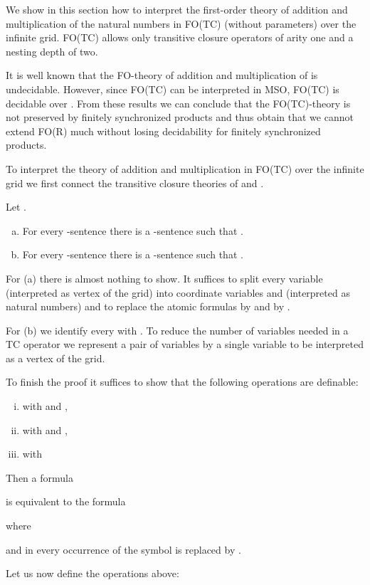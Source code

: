 \documentclass{LMCS}
\begin{document}
{We show in this section how to interpret the first-order theory of 
addition and multiplication of the natural numbers  
in FO(TC) (without parameters) over the infinite grid. 
FO(TC) allows only transitive closure operators of arity one and 
a nesting depth of two. 

It is well known that the FO-theory of addition and multiplication 
of  is undecidable. However, since FO(TC) can be interpreted
in MSO,  FO(TC) is decidable over . From these results we can 
conclude that the  FO(TC)-theory is not preserved by finitely
synchronized products and thus obtain that we cannot extend FO(R)
much without losing decidability for finitely synchronized products.

To interpret the theory of addition and multiplication in FO(TC)
over the infinite grid we first connect the transitive closure theories of
 and .

\begin{lem}\label{lem:grid<->N} Let .
\begin{enumerate}[(a)] 
\item For every -sentence  there is a 
-sentence  such that 
.
\item 
For every -sentence  there is a 
-sentence  such that 
.
\end{enumerate}
\end{lem}
\proof
For (a) there is almost nothing to show. It suffices to split every variable
 (interpreted as vertex of the grid) into coordinate variables  and 
(interpreted as natural numbers) and to replace the atomic formulas
 by  and  by  . 

For (b) we identify every  with .
To reduce the number of variables needed in a TC operator 
we represent a pair of variables  by a single variable 
 to be interpreted as a vertex of the grid. 

To finish the proof it suffices to show that the following operations are
  definable:
\begin{enumerate}[(i)]
\item  with  and ,
\item  with  and ,
\item  with 
\end{enumerate}

Then a  formula  

is equivalent to the  formula


where

and in  every occurrence of the symbol  is replaced by .

Let us now define the operations above:


}
\end{document}
